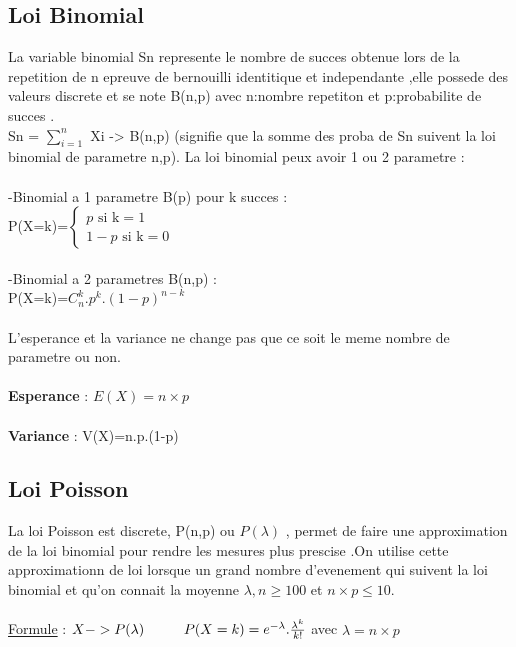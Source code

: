 \documentclass[a4paper,8pt,openany]{book}
\newcommand\tab[1][1cm]{\hspace*{#1}}
\begin{document}
\subsection{Loi Binomial}

La variable binomial Sn represente le nombre de succes obtenue lors de la repetition de n epreuve de bernouilli identitique et independante ,elle possede des valeurs discrete et se note B(n,p) avec n:nombre repetiton et p:probabilite de succes .\\
Sn = $\sum\limits_{i=1}^n$ Xi -> B(n,p) (signifie que la somme des proba de Sn suivent la loi binomial de parametre n,p). La loi binomial peux avoir 1 ou 2 parametre :\\
\\
-Binomial a 1 parametre B(p) pour k succes : \\
P(X=k)=$\left\{
\begin{array}{l}
  p \text{ si k}=1 \\
  1-p \text{ si k}=0
\end{array}
\right.$\\
\\
-Binomial a 2 parametres B(n,p) : \\
P(X=k)=$C_n^k.p^k.(1-p)^{n-k}$\\
\\
L'esperance et la variance ne change pas que ce soit le meme nombre de parametre ou non.\\
\\
\textbf{Esperance} : $E(X)=n\times p$\\
\\
\textbf{Variance} : V(X)=n.p.(1-p)\\ 

\subsection{Loi Poisson}
La loi Poisson est discrete, P(n,p) ou $P(\lambda)$ , permet de faire une approximation de la loi binomial pour rendre les mesures plus prescise .On utilise cette approximationn de loi lorsque un grand nombre d'evenement qui suivent la loi binomial et qu'on connait la moyenne $\lambda , n\geq 100$ et $n\times p\leq 10$.\\
\\
\underline{Formule} :  $X->P(\lambda) \tab P(X=k)=e^{-\lambda}.\frac{\lambda^k}{k!}$ avec $\lambda=n\times p$\\
\\
\end{document}
